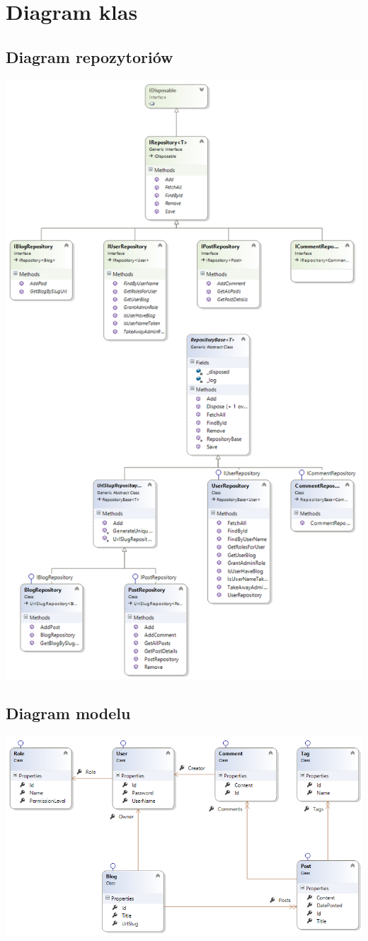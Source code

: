 \documentclass{article}
\begin{document}
\section{Diagram klas}
\subsection{Diagram repozytoriów}
\includegraphics[width=\textwidth]{RepositoryClassDiagram}
\subsection{Diagram modelu}
\includegraphics[width=\textwidth]{ModelClassDiagram}
\end{document}
